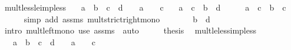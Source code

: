 \begin{isabellebody}
\endisatagproof
{\isafoldproof}%
%
\isadelimproof
\isanewline
%
\endisadelimproof
\isanewline
{}\isamarkupfalse%
\ mult{\isacharunderscore}{\kern0pt}less{\isacharunderscore}{\kern0pt}le{\isacharunderscore}{\kern0pt}imp{\isacharunderscore}{\kern0pt}less{\isacharcolon}{\kern0pt}\isanewline
\ \ \ {\isachardoublequoteopen}a\ {\isacharless}{\kern0pt}\ b{\isachardoublequoteclose}\ \ {\isachardoublequoteopen}c\ {\isasymle}\ d{\isachardoublequoteclose}\ \ {\isachardoublequoteopen}{}\ {\isasymle}\ a{\isachardoublequoteclose}\ \ {\isachardoublequoteopen}{}\ {\isacharless}{\kern0pt}\ c{\isachardoublequoteclose}\isanewline
\ \ \ {\isachardoublequoteopen}a\ {\isacharasterisk}{\kern0pt}\ c\ {\isacharless}{\kern0pt}\ b\ {\isacharasterisk}{\kern0pt}\ d{\isachardoublequoteclose}\isanewline
%
\isadelimproof
%
\endisadelimproof
%
\isatagproof
{}\isamarkupfalse%
\ {\isacharminus}{\kern0pt}\isanewline
\ \ \isamarkupfalse%
\ {\isachardoublequoteopen}a\ {\isacharasterisk}{\kern0pt}\ c\ {\isacharless}{\kern0pt}\ b\ {\isacharasterisk}{\kern0pt}\ c{\isachardoublequoteclose}\isanewline
\ \ \ \ \isamarkupfalse%
\ {\isacharparenleft}{\kern0pt}simp\ add{\isacharcolon}{\kern0pt}\ assms\ mult{\isacharunderscore}{\kern0pt}strict{\isacharunderscore}{\kern0pt}right{\isacharunderscore}{\kern0pt}mono{\isacharparenright}{\kern0pt}\isanewline
\ \ \isamarkupfalse%
\ \isamarkupfalse%
\ {\isachardoublequoteopen}{\isachardot}{\kern0pt}{\isachardot}{\kern0pt}{\isachardot}{\kern0pt}\ {\isasymle}\ b\ {\isacharasterisk}{\kern0pt}\ d{\isachardoublequoteclose}\isanewline
\ \ \ \ \isamarkupfalse%
\ {\isacharparenleft}{\kern0pt}intro\ mult{\isacharunderscore}{\kern0pt}left{\isacharunderscore}{\kern0pt}mono{\isacharparenright}{\kern0pt}\ {\isacharparenleft}{\kern0pt}use\ assms\ \ auto{\isacharparenright}{\kern0pt}\isanewline
\ \ \isamarkupfalse%
\ \isamarkupfalse%
\ {\isacharquery}{\kern0pt}thesis\ \isacommand{{\isachardot}{\kern0pt}}\isamarkupfalse%
\isanewline
{}\isamarkupfalse%
%
\endisatagproof
{\isafoldproof}%
%
\isadelimproof
\isanewline
%
\endisadelimproof
\isanewline
{}\isamarkupfalse%
\ mult{\isacharunderscore}{\kern0pt}le{\isacharunderscore}{\kern0pt}less{\isacharunderscore}{\kern0pt}imp{\isacharunderscore}{\kern0pt}less{\isacharcolon}{\kern0pt}\isanewline
\ \ \ {\isachardoublequoteopen}a\ {\isasymle}\ b{\isachardoublequoteclose}\ \ {\isachardoublequoteopen}c\ {\isacharless}{\kern0pt}\ d{\isachardoublequoteclose}\ \ {\isachardoublequoteopen}{}\ {\isacharless}{\kern0pt}\ a{\isachardoublequoteclose}\ \ {\isachardoublequoteopen}{}\ {\isasymle}\ c{\isachardoublequoteclose}\isanewline

\end{isabellebody}
